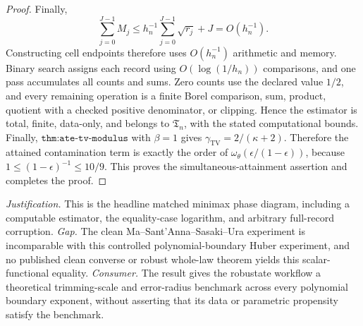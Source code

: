 \documentclass{article}
\begin{document}
\begin{proof}
Finally,
\[
\sum_{j=0}^{J-1}M_j
\leq h_n^{-1}\sum_{j=0}^{J-1}\sqrt{r_j}+J
=O(h_n^{-1}).
\]
Constructing cell endpoints therefore uses \(O(h_n^{-1})\) arithmetic and memory. Binary search assigns each record using \(O(\log(1/h_n))\) comparisons, and one pass accumulates all counts and sums. Zero counts use the declared value \(1/2\), and every remaining operation is a finite Borel comparison, sum, product, quotient with a checked positive denominator, or clipping. Hence the estimator is total, finite, data-only, and belongs to \(\mathfrak T_n\), with the stated computational bounds. Finally, \(\texttt{thm:ate-tv-modulus}\) with \(\beta=1\) gives \(\gamma_{\mathrm{TV}}=2/(\kappa+2)\). Therefore the attained contamination term is exactly the order of \(\omega_\theta(\epsilon/(1-\epsilon))\), because \(1\leq(1-\epsilon)^{-1}\leq10/9\). This proves the simultaneous-attainment assertion and completes the proof.
\end{proof}
\par\smallskip\noindent \textit{Justification.} This is the headline matched minimax phase diagram, including a computable estimator, the equality-case logarithm, and arbitrary full-record corruption. \textit{Gap.} The clean Ma--Sant'Anna--Sasaki--Ura experiment is incomparable with this controlled polynomial-boundary Huber experiment, and no published clean converse or robust whole-law theorem yields this scalar-functional equality. \textit{Consumer.} The result gives the robustate workflow a theoretical trimming-scale and error-radius benchmark across every polynomial boundary exponent, without asserting that its data or parametric propensity satisfy the benchmark.
\end{document}
